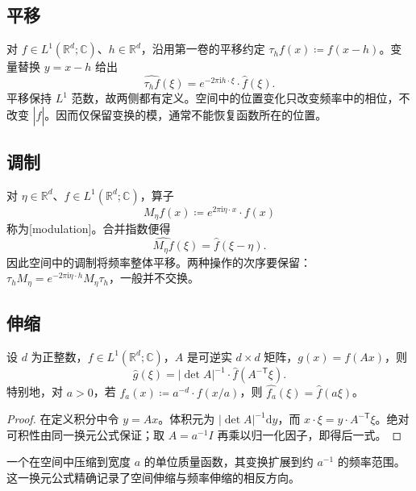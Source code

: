 \subsection{平移}
\label{b2:subsec:030102}

对 \(f\in L^1(\mathbb R^d;\mathbb C)\)、\(h\in\mathbb R^d\)，沿用第一卷的平移约定 \(\tau_hf(x)\coloneqq f(x-h)\)。变量替换 \(y=x-h\) 给出
\[
 \widehat{\tau_hf}(\xi)=e^{-2\pi\mathrm{i}h\cdot\xi}\cdot\widehat f(\xi).
\]
平移保持 \(L^1\) 范数，故两侧都有定义。空间中的位置变化只改变频率中的相位，不改变 \(|\widehat f|\)。因而仅保留变换的模，通常不能恢复函数所在的位置。

\subsection{调制}
\label{b2:subsec:030103}

对 \(\eta\in\mathbb R^d\)、\(f\in L^1(\mathbb R^d;\mathbb C)\)，算子
\[
 M_\eta f(x)\coloneqq e^{2\pi\mathrm{i}\eta\cdot x}\cdot f(x)
\]
称为[modulation]。合并指数便得
\[
 \widehat{M_\eta f}(\xi)=\widehat f(\xi-\eta).
\]
因此空间中的调制将频率整体平移。两种操作的次序要保留：\(\tau_hM_\eta=e^{-2\pi\mathrm{i}\eta\cdot h}M_\eta\tau_h\)，一般并不交换。

\subsection{伸缩}
\label{b2:subsec:030104}

\begin{proposition}\label{b2:prop:03-linear-change}
设 \(d\) 为正整数，\(f\in L^1(\mathbb R^d;\mathbb C)\)，\(A\) 是可逆实 \(d\times d\) 矩阵，\(g(x)=f(Ax)\)，则
\[
 \widehat g(\xi)=|\det A|^{-1}\cdot\widehat f(A^{-\mathsf T}\xi).
\]
特别地，对 \(a>0\)，若 \(f_a(x)\coloneqq a^{-d}\cdot f(x/a)\)，则 \(\widehat{f_a}(\xi)=\widehat f(a\xi)\)。
\end{proposition}
\begin{proof}
在定义积分中令 \(y=Ax\)。体积元为 \(|\det A|^{-1}\mathrm{d}y\)，而 \(x\cdot\xi=y\cdot A^{-\mathsf T}\xi\)。绝对可积性由同一换元公式保证；取 \(A=a^{-1}I\) 再乘以归一化因子，即得后一式。
\end{proof}

一个在空间中压缩到宽度 \(a\) 的单位质量函数，其变换扩展到约 \(a^{-1}\) 的频率范围。这一换元公式精确记录了空间伸缩与频率伸缩的相反方向。


